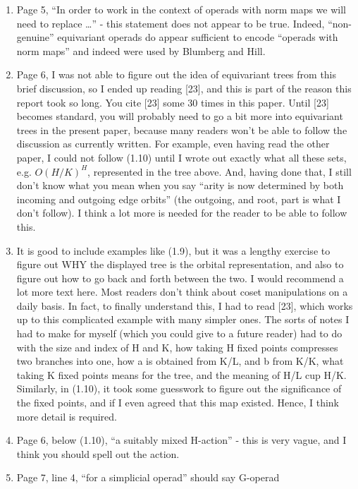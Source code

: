 \documentclass{article}
\begin{document}
\begin{enumerate}
\item
Page 5, ``In order to work in the context of operads with norm maps we will
need to replace \dots'' - this statement does not appear to be true. Indeed, ``non-genuine'' equivariant operads do appear sufficient to encode ``operads with norm maps'' and indeed were used by Blumberg and Hill. 

\item
Page 6, I was not able to figure out the idea of equivariant trees from this brief discussion, so I ended up reading [23], and this is part of the reason this report took so long. You cite [23] some 30 times in this paper. Until [23] becomes standard, you will probably need to go a bit more into equivariant trees in the present paper, because many readers won't be able to follow the discussion as currently written. For example, even having read the other paper, I could not follow (1.10) until I wrote out exactly what all these sets, e.g. $O(H/K)^H$, represented in the tree above. And, having done that, I still don't know what you mean when you say ``arity is now determined by both incoming and outgoing edge orbits'' (the outgoing, and root, part is what I don't follow). I think a lot more is needed for the reader to be able to follow this.

\item 
It is good to include examples like (1.9), but it was a lengthy exercise to figure out WHY the displayed tree is the orbital representation, and also to figure out how to go back and forth between the two. I would recommend a lot more text here. Most readers don't think about coset manipulations on a daily basis. In fact, to finally understand this, I had to read [23], which works up to this complicated example with many simpler ones. The sorts of notes I had to make for myself (which you could give to a future reader) had to do with the size and index of H and K, how taking H fixed points compresses two branches into one, how a is obtained from K/L, and b from K/K, what taking K fixed points means for the tree, and the meaning of H/L cup H/K. Similarly, in (1.10), it took some guesswork to figure out the significance of the fixed points, and if I even agreed that this map existed. Hence, I think more detail is required.

\item
Page 6, below (1.10), ``a suitably mixed H-action'' - this is very vague, and I think you should spell out the action.

\item
Page 7, line 4, ``for a simplicial operad'' should say G-operad


\end{enumerate}
\end{document}
